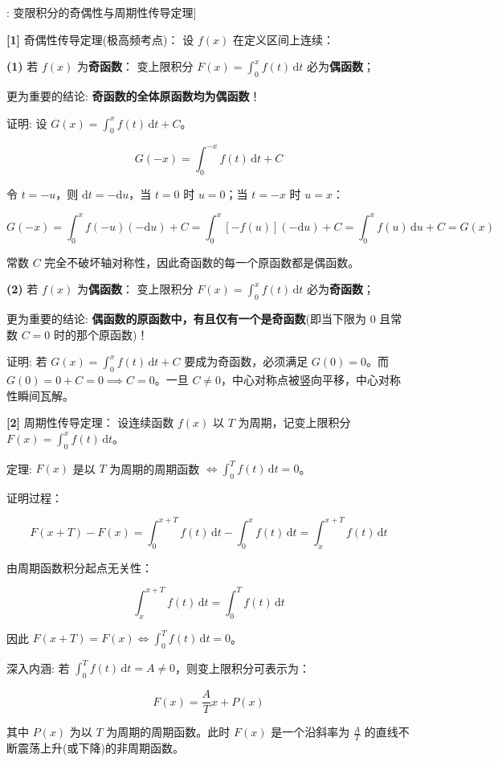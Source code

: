 \documentclass[11pt,a4paper,UTF8]{ctexart}
\begin{document}
\begin{thmbox}[定理[1]: 变限积分的奇偶性与周期性传导定理]

\textbf{[1]} 奇偶性传导定理(极高频考点)：
设 $f(x)$ 在定义区间上连续：

\textbf{(1)}  若 $f(x)$ 为\textbf{奇函数}：
变上限积分 $F(x) = \int_0^x f(t)\,\mathrm{d}t$ 必为\textbf{偶函数}；

更为重要的结论: \textbf{奇函数的全体原函数均为偶函数}！

证明: 设 $G(x) = \int_0^x f(t)\,\mathrm{d}t + C$。


\begin{equation*}
G(-x) = \int_0^{-x} f(t)\,\mathrm{d}t + C
\end{equation*}


令 $t = -u$，则 $\mathrm{d}t = -\mathrm{d}u$，当 $t=0$ 时 $u=0$；当 $t=-x$ 时 $u=x$：


\begin{equation*}
G(-x) = \int_0^x f(-u)(-\mathrm{d}u) + C = \int_0^x [-f(u)](-\mathrm{d}u) + C = \int_0^x f(u)\,\mathrm{d}u + C = G(x)
\end{equation*}


常数 $C$ 完全不破坏轴对称性，因此奇函数的每一个原函数都是偶函数。

\textbf{(2)}  若 $f(x)$ 为\textbf{偶函数}：
变上限积分 $F(x) = \int_0^x f(t)\,\mathrm{d}t$ 必为\textbf{奇函数}；

更为重要的结论: \textbf{偶函数的原函数中，有且仅有一个是奇函数}(即当下限为 0 且常数 $C = 0$ 时的那个原函数)！

证明: 若 $G(x) = \int_0^x f(t)\,\mathrm{d}t + C$ 要成为奇函数，必须满足 $G(0) = 0$。而 $G(0) = 0 + C = 0 \implies C = 0$。一旦 $C \neq 0$，中心对称点被竖向平移，中心对称性瞬间瓦解。

\textbf{[2]} 周期性传导定理：
设连续函数 $f(x)$ 以 $T$ 为周期，记变上限积分 $F(x) = \int_0^x f(t)\,\mathrm{d}t$。

定理: $F(x)$ 是以 $T$ 为周期的周期函数 $\iff \int_0^T f(t)\,\mathrm{d}t = 0$。

证明过程：


\begin{equation*}
F(x+T) - F(x) = \int_0^{x+T} f(t)\,\mathrm{d}t - \int_0^x f(t)\,\mathrm{d}t = \int_x^{x+T} f(t)\,\mathrm{d}t
\end{equation*}


由周期函数积分起点无关性：


\begin{equation*}
\int_x^{x+T} f(t)\,\mathrm{d}t = \int_0^T f(t)\,\mathrm{d}t
\end{equation*}


因此 $F(x+T) = F(x) \iff \int_0^T f(t)\,\mathrm{d}t = 0$。

深入内涵: 若 $\int_0^T f(t)\,\mathrm{d}t = A \neq 0$，则变上限积分可表示为：


\begin{equation*}
F(x) = \frac{A}{T}x + P(x)
\end{equation*}


其中 $P(x)$ 为以 $T$ 为周期的周期函数。此时 $F(x)$ 是一个沿斜率为 $\frac{A}{T}$ 的直线不断震荡上升(或下降)的非周期函数。

\end{thmbox}
\end{document}
